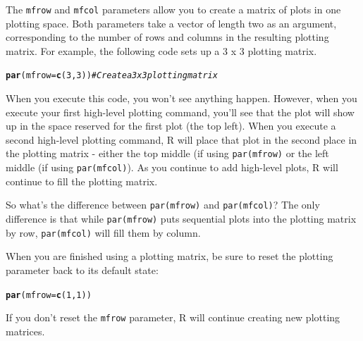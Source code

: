 \documentclass{tufte-book}\usepackage[]{graphicx}\usepackage[]{color}
\makeatletter
\newcommand{\hlnum}[1]{\textcolor[rgb]{0.686,0.059,0.569}{#1}}%
\newcommand{\hlcom}[1]{\textcolor[rgb]{0.678,0.584,0.686}{\textit{#1}}}%
\newcommand{\hlstd}[1]{\textcolor[rgb]{0.345,0.345,0.345}{#1}}%
\newcommand{\hlkwc}[1]{\textcolor[rgb]{0.333,0.667,0.333}{#1}}%
\newcommand{\hlkwd}[1]{\textcolor[rgb]{0.737,0.353,0.396}{\textbf{#1}}}%
\newenvironment{kframe}{%
 \def\at@end@of@kframe{}%
 \ifinner\ifhmode%
  \def\at@end@of@kframe{\end{minipage}}%
  \begin{minipage}{\columnwidth}%
 \fi\fi%
 \def\FrameCommand##1{\hskip\@totalleftmargin \hskip-\fboxsep
 \colorbox{shadecolor}{##1}\hskip-\fboxsep
     \hskip-\linewidth \hskip-\@totalleftmargin \hskip\columnwidth}%
 \MakeFramed {\advance\hsize-\width
   \@totalleftmargin\z@ \linewidth\hsize
   \@setminipage}}%
 {\par\unskip\endMakeFramed%
 \at@end@of@kframe}
\newenvironment{knitrout}{}{} %
\makeatother
\begin{document}
\begin{footnotesize}
The \texttt{mfrow} and \texttt{mfcol} parameters allow you to create a matrix of plots in one plotting space. Both parameters take a vector of length two as an argument, corresponding to the number of rows and columns in the resulting plotting matrix. For example, the following code sets up a 3 x 3 plotting matrix.

\begin{knitrout}
\color{fgcolor}\begin{kframe}
\begin{alltt}
\hlkwd{par}\hlstd{(}\hlkwc{mfrow} \hlstd{=} \hlkwd{c}\hlstd{(}\hlnum{3}\hlstd{,} \hlnum{3}\hlstd{))} \hlcom{# Create a 3 x 3 plotting matrix}
\end{alltt}
\end{kframe}
\end{knitrout}

When you execute this code, you won't see anything happen. However, when you execute your first high-level plotting command, you'll see that the plot will show up in the space reserved for the first plot (the top left). When you execute a second high-level plotting command, R will place that plot in the second place in the plotting matrix - either the top middle (if using \texttt{par(mfrow)} or the left middle (if using \texttt{par(mfcol)}). As you continue to add high-level plots, R will continue to fill the plotting matrix.

So what's the difference between \texttt{par(mfrow)} and \texttt{par(mfcol)}? The only difference is that while \texttt{par(mfrow)} puts sequential plots into the plotting matrix by row, \texttt{par(mfcol)} will fill them by column.

When you are finished using a plotting matrix, be sure to reset the plotting parameter back to its default state:

\begin{knitrout}
\color{fgcolor}\begin{kframe}
\begin{alltt}
\hlkwd{par}\hlstd{(}\hlkwc{mfrow} \hlstd{=} \hlkwd{c}\hlstd{(}\hlnum{1}\hlstd{,} \hlnum{1}\hlstd{))}
\end{alltt}
\end{kframe}
\end{knitrout}

If you don't reset the \texttt{mfrow} parameter, R will continue creating new plotting matrices.


\end{footnotesize}
\end{document}

